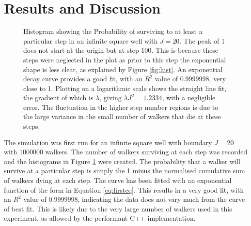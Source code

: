 \documentclass[journal]{IEEEtran}
\begin{document}
\section{Results and Discussion}


\begin{figure}[ht!]
  \centering
  \centering
  \caption{Histogram showing the Probability of surviving to at least a
    particular step in an infinite square well with $J = 20$. The peak of 1 does
    not start at the origin but at step 100. This is because these steps were
    neglected in the plot as prior to this step the exponential shape is less
    clear, as explained by Figure \ref{fig:hist}. An exponential decay curve
    provides a good fit, with an $R^2$ value of 0.9999998, very close to
    1. Plotting on a logarithmic scale shows the straight line fit, the gradient
    of which is $\lambda$, giving $\lambda J^2 = 1.2334$, with a negligible
    error. The fluctuation in the higher step number regions is due to the large
    variance in the small number of walkers that die at these steps.}
  \label{fig:cumplots}
\end{figure}

The simulation was first run for an infinite square well with boundary $J=20$
with 1000000 walkers. The number of walkers surviving at each step was recorded
and the histograms in Figure \ref{fig:cumplots} were created. The probability
that a walker will survive at a particular step is simply the 1 minus the
normalised cumulative sum of walkers dying at each step. The curve has been
fitted with an exponential function of the form in Equation
\ref{eq:firsteq}. This results in a very good fit, with an $R^2$ value of
0.9999998, indicating the data does not vary much from the curve of best
fit. This is likely due to the very large number of walkers used in this
experiment, as allowed by the performant C++ implementation.
\end{document}
